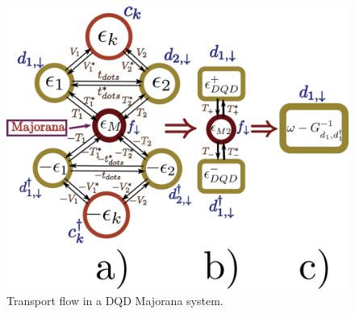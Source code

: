 \documentclass[showpacs,aps,prb,reprint,superscriptaddress]{revtex4-1}
\begin{document}






    \begin{figure}[t]
    \begin{center}
    \centering
     \includegraphics[scale=0.29]{Graficos/Graphs-DQD-M-Pro.png}
    \caption{ Transport flow in a DQD Majorana system.   \label{fig:Transport}
    }
    
    \end{center}
    \end{figure}


%
\end{document}
